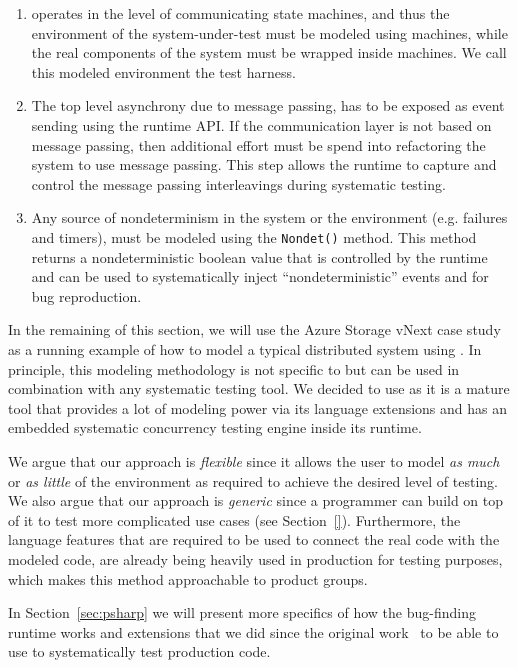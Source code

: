 \begin{enumerate}
\item \psharp operates in the level of communicating state machines, and thus the environment of the system-under-test must be modeled using \psharp machines, while the real components of the system must be wrapped inside \psharp machines. We call this modeled environment the \psharp test harness.

\item The top level asynchrony due to message passing, has to be exposed as event sending using the \psharp runtime API. If the communication layer is not based on message passing, then additional effort must be spend into refactoring the system to use message passing. This step allows the \psharp runtime to capture and control the message passing interleavings during systematic testing.

\item Any source of nondeterminism in the system or the environment (e.g. failures and timers), must be modeled using the \psharp \texttt{Nondet()} method. This method returns a nondeterministic boolean value that is controlled by the \psharp runtime and can be used to systematically inject ``nondeterministic'' events and for bug reproduction.
\end{enumerate}

In the remaining of this section, we will use the Azure Storage vNext case study as a running example of how to model a typical distributed system using \psharp. In principle, this modeling methodology is not specific to \psharp but can be used in combination with any systematic testing tool. We decided to use \psharp as it is a mature tool that provides a lot of modeling power via its \csharp language extensions and has an embedded systematic concurrency testing engine inside its runtime.

We argue that our approach is \emph{flexible} since it allows the user to model \emph{as much} or \emph{as little} of the environment as required to achieve the desired level of testing. We also argue that our approach is \emph{generic} since a programmer can build on top of it to test more complicated use cases (see Section~\ref{}). Furthermore, the language features that are required to be used to connect the real code with the modeled code, are already being heavily used in production for testing purposes, which makes this method approachable to product groups.

In Section~\ref{sec:psharp} we will present more specifics of how the \psharp bug-finding runtime works and extensions that we did since the original work~\cite{deligiannis2015psharp} to be able to use \psharp to systematically test production code.

